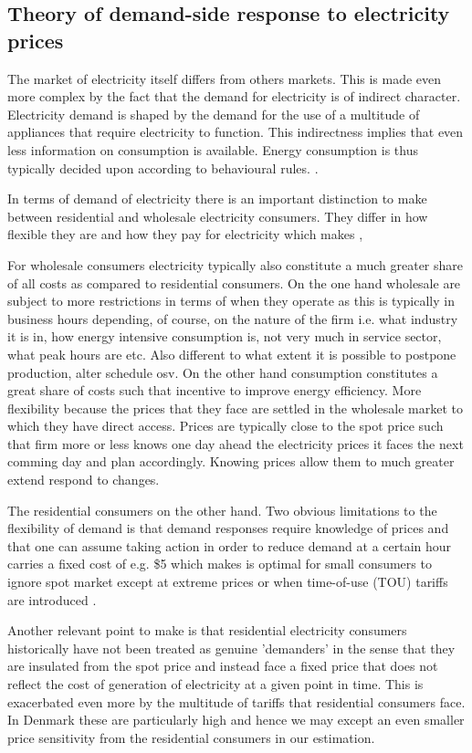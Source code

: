 \subsection{Theory of demand-side response to electricity prices}
\label{subsec:t_demand}
The market of electricity itself differs from others markets. This is made even more complex by the fact that the demand for electricity is of indirect character. Electricity demand is shaped by the demand for the use of a multitude of appliances that require electricity to function. This indirectness implies that even less information on consumption is available. Energy consumption is thus typically decided upon according to behavioural rules. \citep{kirschen2003demand}. 

In terms of demand of electricity there is an important distinction to make between residential and wholesale electricity consumers. They differ in how flexible they are and how they pay for electricity which makes , 

For wholesale consumers electricity typically also constitute a much greater share of all costs as compared to residential consumers. 
On the one hand wholesale are subject to more restrictions in terms of when they operate as this is typically in business hours depending, of course, on the nature of the firm i.e. what industry it is in, how energy intensive consumption is, not very much in service sector, what peak hours are etc. Also different to what extent it is possible to postpone production, alter schedule osv. On the other hand consumption constitutes a great share of costs such that incentive to improve energy efficiency. More flexibility because the prices that they face are settled in the wholesale market to which they have direct access. Prices are typically close to the spot price such that firm more or less knows one day ahead the electricity prices it faces the next comming day and plan accordingly. Knowing prices allow them to much greater extend respond to changes. 

The residential consumers on the other hand. 
Two obvious limitations to the flexibility of demand is that demand responses require knowledge of prices and that one can assume taking action in order to reduce demand at a certain hour carries a fixed cost of e.g. \$5 which makes is optimal for small consumers to ignore spot market except at extreme prices or when time-of-use (TOU) tariffs are introduced \citep{wolak2011residential}. 

Another relevant point to make is that residential electricity consumers historically have not been treated as genuine 'demanders' in the sense that they are insulated from the spot price and instead face a fixed price that does not reflect the cost of generation of electricity at a given point in time. This is exacerbated even more by the multitude of tariffs that residential consumers face.  
In Denmark these are particularly high and hence we may except an even smaller price sensitivity from the residential consumers in our estimation.   

